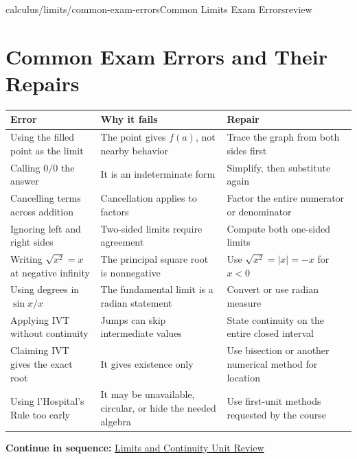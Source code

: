 \documentclass[11pt,openany]{book}
\theoremstyle{bgplain}
\newcommand{\webnext}[2]{%
  \par\addvspace{1.2em}\noindent{\color{BGLine}\rule{\textwidth}{0.35pt}}\par\smallskip
  {\small\color{BGGray}\textbf{Continue in sequence:} \hyperlink{web:#1}{#2}}\par
}
\begin{document}
\begin{webpage}{calculus/limits/common-exam-errors}{Common Limits Exam Errors}{review}
\section{Common Exam Errors and Their Repairs}

\begin{center}
\begin{longtable}{@{}p{}p{}p{}@{}}
\toprule
\textbf{Error} & \textbf{Why it fails} & \textbf{Repair}\\
\midrule
\endhead
Using the filled point as the limit & The point gives \(f(a)\), not nearby behavior & Trace the graph from both sides first\\
Calling \(0/0\) the answer & It is an indeterminate form & Simplify, then substitute again\\
Cancelling terms across addition & Cancellation applies to factors & Factor the entire numerator or denominator\\
Ignoring left and right sides & Two-sided limits require agreement & Compute both one-sided limits\\
Writing \(\sqrt{x^2}=x\) at negative infinity & The principal square root is nonnegative & Use \(\sqrt{x^2}=|x|=-x\) for \(x<0\)\\
Using degrees in \(\sin x/x\) & The fundamental limit is a radian statement & Convert or use radian measure\\
Applying IVT without continuity & Jumps can skip intermediate values & State continuity on the entire closed interval\\
Claiming IVT gives the exact root & It gives existence only & Use bisection or another numerical method for location\\
Using l'Hospital's Rule too early & It may be unavailable, circular, or hide the needed algebra & Use first-unit methods requested by the course\\
\bottomrule
\end{longtable}
\end{center}
\webnext{calculus/limits/unit-review}{Limits and Continuity Unit Review}
\end{webpage}
\end{document}
